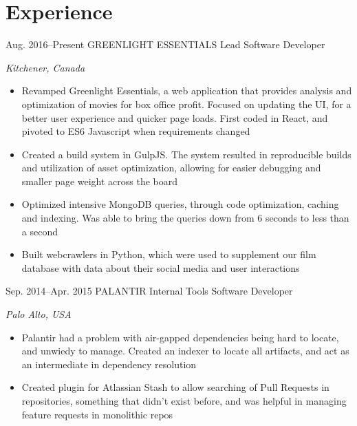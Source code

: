 \documentclass{resume-class}
\begin{document}


\section{Experience}

\begin{sectionlist}
	\entry
	{Aug. 2016--Present}
	{GREENLIGHT ESSENTIALS}
	{Lead Software Developer}
	{\emph {Kitchener, Canada}\\
		\begin{itemize}
		    \setlength{\itemsep}{0.2em}
			\item Revamped Greenlight Essentials, a web application that provides analysis and optimization of movies for box office profit. Focused on updating the UI, for a better user experience and quicker page loads. First coded in React, and pivoted to ES6 Javascript when requirements changed
			\item Created a build system in GulpJS. The system resulted in reproducible builds and utilization of asset optimization, allowing for easier debugging and smaller page weight across the board
			\item Optimized intensive MongoDB queries, through code optimization, caching and indexing. Was able to bring the queries down from 6 seconds to less than a second
			\item Built webcrawlers in Python, which were used to supplement our film database with data about their social media and user interactions
		\end{itemize}
	}
	
	\entry
	{Sep. 2014--Apr. 2015}
	{PALANTIR}
	{Internal Tools Software Developer}
	{\emph {Palo Alto, USA} \\
		\begin{itemize}
		    \setlength{\itemsep}{0.2em}
			\item Palantir had a problem with air-gapped dependencies being hard to locate, and unwiedy to manage. Created an indexer to locate all  artifacts, and act as an intermediate in dependency resolution
			\item Created plugin for Atlassian Stash to allow searching of Pull Requests in repositories, something that didn't exist before, and was helpful in managing feature requests in monolithic repos
		\end{itemize}
	}
	

\end{sectionlist}
\end{document}
